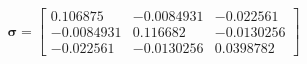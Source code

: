 $$
\boldsymbol\sigma = \left[\begin{matrix}0.106875 & -0.0084931 & -0.022561\\-0.0084931 & 0.116682 & -0.0130256\\-0.022561 & -0.0130256 & 0.0398782\end{matrix}\right]
$$
